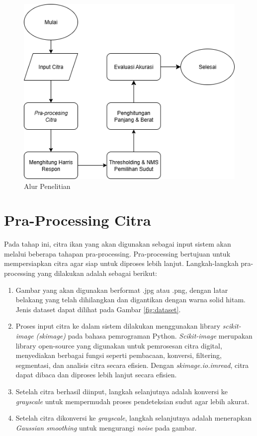 \begin{figure}
    \centering
    \includegraphics[scale= 0.7]{gambar/Alur Penelitian.png}
    \caption{Alur Penelitian}
    \label{Alur Penelitian}
\end{figure}

\section{Pra-Processing Citra}
    Pada tahap ini, citra ikan yang akan digunakan sebagai input sistem akan melalui beberapa tahapan pra-processing.
Pra-processing bertujuan untuk mempersiapkan citra agar siap untuk diproses lebih lanjut. Langkah-langkah pra-processing yang dilakukan adalah sebagai berikut:
\begin{enumerate}
    \item Gambar yang akan digunakan berformat .jpg atau .png, dengan latar belakang yang telah dihilangkan dan digantikan dengan warna solid hitam.  Jenis dataset dapat dilihat pada Gambar \ref{fig:dataset}.
    \item Proses input citra ke dalam sistem dilakukan menggunakan library \emph{scikit-image (skimage)} pada bahasa pemrograman Python. \emph{Scikit-image} merupakan library open-source yang digunakan untuk pemrosesan citra digital, menyediakan berbagai fungsi seperti pembacaan, konversi, filtering, segmentasi, dan analisis citra secara efisien. Dengan \emph{skimage.io.imread}, citra dapat dibaca dan diproses lebih lanjut secara efisien.
    \item Setelah citra berhasil diinput, langkah selanjutnya adalah konversi ke \emph{grayscale} untuk mempermudah proses pendeteksian sudut agar lebih akurat.
    \item Setelah citra dikonversi ke \emph{grayscale}, langkah selanjutnya adalah menerapkan \emph{Gaussian smoothing} untuk mengurangi \emph{noise} pada gambar.
\end{enumerate}


